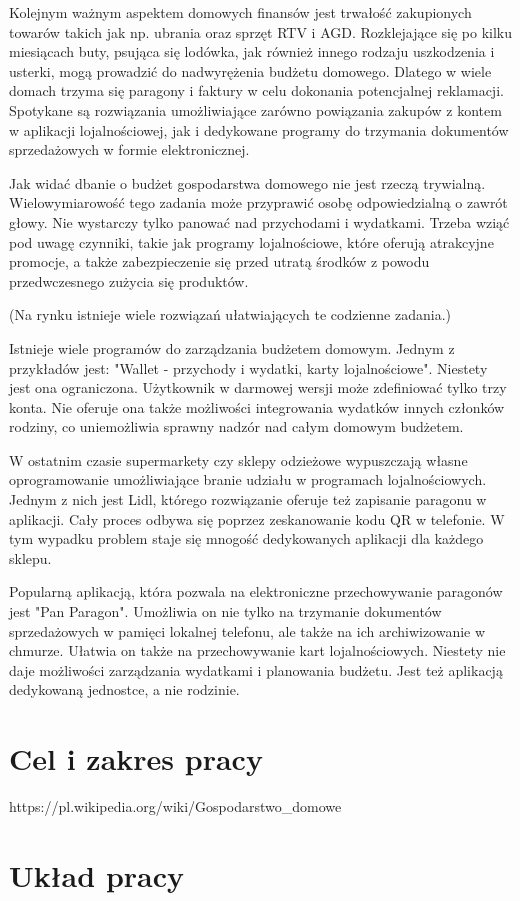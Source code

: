 Kolejnym ważnym aspektem domowych finansów jest trwałość zakupionych towarów takich jak np. ubrania oraz sprzęt RTV i AGD. Rozklejające się po kilku miesiącach buty, psująca się lodówka, jak również innego rodzaju uszkodzenia i usterki, mogą prowadzić do nadwyrężenia budżetu domowego. Dlatego w wiele domach trzyma się paragony i faktury w celu dokonania potencjalnej reklamacji. Spotykane są rozwiązania umożliwiające zarówno powiązania zakupów z kontem w aplikacji lojalnościowej, jak i dedykowane programy do trzymania dokumentów sprzedażowych w formie elektronicznej.

Jak widać dbanie o budżet gospodarstwa domowego nie jest rzeczą trywialną. Wielowymiarowość tego zadania może przyprawić osobę odpowiedzialną o zawrót głowy. Nie wystarczy tylko panować nad przychodami i wydatkami. Trzeba wziąć pod uwagę czynniki, takie jak programy lojalnościowe, które oferują atrakcyjne promocje, a także zabezpieczenie się przed utratą środków z powodu przedwczesnego zużycia się produktów. 

(Na rynku istnieje wiele rozwiązań ułatwiających te codzienne zadania.)

Istnieje wiele programów do zarządzania budżetem domowym. Jednym z przykładów jest: "Wallet - przychody i wydatki, karty lojalnościowe". Niestety jest ona ograniczona. Użytkownik w darmowej wersji może zdefiniować tylko trzy konta. Nie oferuje ona także możliwości integrowania wydatków innych członków rodziny, co uniemożliwia sprawny nadzór nad całym domowym budżetem.

W ostatnim czasie supermarkety czy sklepy odzieżowe wypuszczają własne oprogramowanie umożliwiające branie udziału w programach lojalnościowych. Jednym z nich jest Lidl, którego rozwiązanie oferuje też zapisanie paragonu w aplikacji. Cały proces odbywa się poprzez zeskanowanie kodu QR w telefonie. W tym wypadku problem staje się mnogość dedykowanych aplikacji dla każdego sklepu.

Popularną aplikacją, która pozwala na elektroniczne przechowywanie paragonów jest "Pan Paragon". Umożliwia on nie tylko na trzymanie dokumentów sprzedażowych w pamięci lokalnej telefonu, ale także na ich archiwizowanie w chmurze. Ułatwia on także na przechowywanie kart lojalnościowych. Niestety nie daje możliwości zarządzania wydatkami i planowania budżetu. Jest też aplikacją dedykowaną jednostce, a nie rodzinie.

\section{Cel i zakres pracy}
https://pl.wikipedia.org/wiki/Gospodarstwo_domowe
\section{Układ pracy}